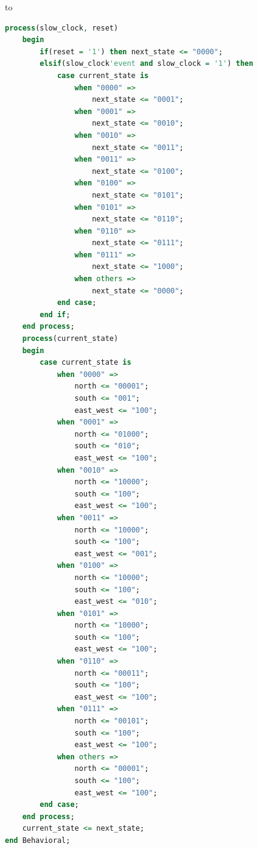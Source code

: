 to\documentclass[11pt]{article}
\begin{document}
\begin{appendices}
\begin{lstlisting}[language=VHDL]
    process(slow_clock, reset)
    begin
        if(reset = '1') then next_state <= "0000";
        elsif(slow_clock'event and slow_clock = '1') then
            case current_state is
                when "0000" =>
                    next_state <= "0001";
                when "0001" =>
                    next_state <= "0010";
                when "0010" =>
                    next_state <= "0011";
                when "0011" =>
                    next_state <= "0100";
                when "0100" =>
                    next_state <= "0101";
                when "0101" =>
                    next_state <= "0110";
                when "0110" =>
                    next_state <= "0111";
                when "0111" =>
                    next_state <= "1000";
                when others =>
                    next_state <= "0000";
            end case;
        end if;
    end process;
    process(current_state)
    begin
        case current_state is
            when "0000" =>
                north <= "00001";
                south <= "001";
                east_west <= "100";
            when "0001" =>
                north <= "01000";
                south <= "010";
                east_west <= "100";
            when "0010" =>
                north <= "10000";
                south <= "100";
                east_west <= "100";
            when "0011" =>
                north <= "10000";
                south <= "100";
                east_west <= "001";
            when "0100" =>
                north <= "10000";
                south <= "100";
                east_west <= "010";
            when "0101" =>
                north <= "10000";
                south <= "100";
                east_west <= "100";
            when "0110" =>
                north <= "00011";
                south <= "100";
                east_west <= "100";
            when "0111" =>
                north <= "00101";
                south <= "100";
                east_west <= "100";
            when others =>
                north <= "00001";
                south <= "100";
                east_west <= "100";
        end case;
    end process;
    current_state <= next_state;
end Behavioral;
\end{lstlisting}


\end{appendices}
\end{document}
